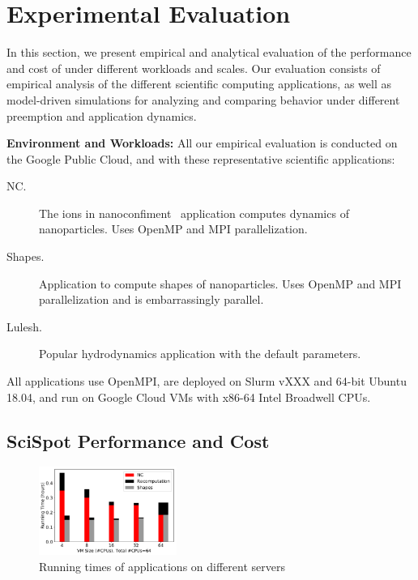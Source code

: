\section{Experimental Evaluation}
\label{sec:eval}

In this section, we present empirical and analytical evaluation of the performance and cost of \sysname under different workloads and scales. 
Our evaluation consists of empirical analysis of the different scientific computing applications, as well as model-driven simulations for analyzing and comparing \sysname behavior under different preemption and application dynamics. 


\noindent \textbf{Environment and Workloads:} All our empirical evaluation is conducted on the Google Public Cloud, and with these representative scientific applications: 
\vspace*{\tightext}
\begin{description}
\item[NC.] The ions in nanoconfiment~\cite{} application computes dynamics of nanoparticles. Uses OpenMP and MPI parallelization. 
\item[Shapes.]  Application to compute shapes of nanoparticles. Uses OpenMP and MPI parallelization and is embarrassingly parallel. 
\item[Lulesh.] Popular hydrodynamics application with the default parameters. 
\end{description}
\vspace*{\tightext}
All applications use OpenMPI, are deployed on Slurm vXXX and 64-bit Ubuntu 18.04, and run on Google Cloud VMs with x86-64 Intel Broadwell CPUs. 


\subsection{SciSpot Performance and Cost}

\begin{figure}
  \centering
  \includegraphics[width=0.4\textwidth]{../graphs/runtime-bars.pdf}
  \caption{Running times of applications on different servers}
  \label{fig:runtimes-bar}
\end{figure}

